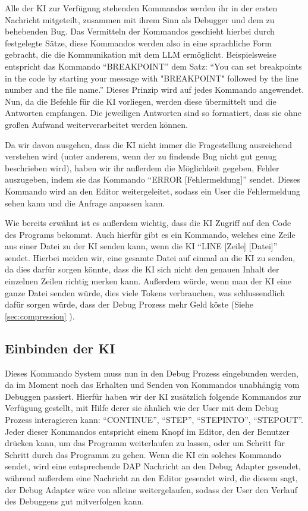 \documentclass[a4paper,12pt,ngerman]{scrartcl}
\begin{document}
Alle der KI zur Verfügung stehenden Kommandos werden ihr in der ersten Nachricht mitgeteilt, zusammen mit ihrem Sinn als Debugger und dem zu behebenden Bug. Das Vermitteln der Kommandos geschieht hierbei durch festgelegte Sätze, diese Kommandos werden also in eine sprachliche Form gebracht, die die Kommunikation mit dem LLM ermöglicht. Beispielsweise entspricht das Kommando ``BREAKPOINT'' dem Satz: ``You can set breakpoints in the code by starting your message with "BREAKPOINT" followed by the line number and the file name.'' Dieses Prinzip wird auf jedes Kommando angewendet. Nun, da die Befehle für die KI vorliegen, werden diese übermittelt und die Antworten empfangen. Die jeweiligen Antworten sind so formatiert, dass sie ohne großen Aufwand weiterverarbeitet werden können.

Da wir davon ausgehen, dass die KI nicht immer die Fragestellung ausreichend verstehen wird (unter anderem, wenn der zu findende Bug nicht gut genug beschrieben wird), haben wir ihr außerdem die Möglichkeit gegeben, Fehler auszugeben, indem sie das Kommando ``ERROR [Fehlermeldung]'' sendet. Dieses Kommando wird an den Editor weitergeleitet, sodass ein User die Fehlermeldung sehen kann und die Anfrage anpassen kann.

Wie bereits erwähnt ist es außerdem wichtig, dass die KI Zugriff auf den Code des Programs bekommt. Auch hierfür gibt es ein Kommando, welches eine Zeile aus einer Datei zu der KI senden kann, wenn die KI ``LINE [Zeile] [Datei]'' sendet. Hierbei meiden wir, eine gesamte Datei auf einmal an die KI zu senden, da dies darfür sorgen könnte, dass die KI sich nicht den genauen Inhalt der einzelnen Zeilen richtig merken kann. Außerdem würde, wenn man der KI eine ganze Datei senden würde, dies viele Tokens verbrauchen, was schlussendlich dafür sorgen würde, dass der Debug Prozess mehr Geld köste (Siehe \autoref{sec:compression} ).

\subsection{Einbinden der KI}

Dieses Kommando System muss nun in den Debug Prozess eingebunden werden, da im Moment noch das Erhalten und Senden von Kommandos unabhängig vom Debuggen passiert. Hierfür haben wir der KI zusätzlich folgende Kommandos zur Verfügung gestellt, mit Hilfe derer sie ähnlich wie der User mit dem Debug Prozess interagieren kann: ``CONTINUE'', ``STEP'', ``STEPINTO'', ``STEPOUT''. Jeder dieser Kommandos entspricht einem Knopf im Editor, den der Benutzer drücken kann, um das Programm weiterlaufen zu lassen, oder um Schritt für Schritt durch das Programm zu gehen. Wenn die KI ein solches Kommando sendet, wird eine entsprechende DAP Nachricht an den Debug Adapter gesendet, während außerdem eine Nachricht an den Editor gesendet wird, die diesem sagt, der Debug Adapter wäre von alleine weitergelaufen, sodass der User den Verlauf des Debuggens gut mitverfolgen kann.
\end{document}
